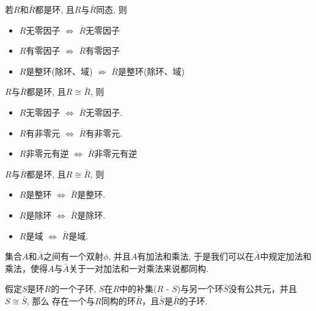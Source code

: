 \begin{Proposition}
若$R$和$\bar{R}$都是环, 且$R$与$\bar{R}$同态, 则
\begin{itemize}
	\item $R$无零因子 $\not\Rightarrow$ $\bar{R}$无零因子
	\item $R$有零因子 $\not\Rightarrow$ $\bar{R}$有零因子
	\item $R$是整环(除环、域) $\not\Rightarrow$ $\bar{R}$是整环(除环、域)
\end{itemize}
\end{Proposition}

\begin{Proposition}
$R$与$\bar{R}$都是环, 且$R \cong \bar{R}$, 则
\begin{itemize}
	\item $R$无零因子 $\Leftrightarrow$ $\bar{R}$无零因子.
	\item $R$有非零元 $\Leftrightarrow$ $\bar{R}$有非零元.
	\item  $R$非零元有逆 $\Leftrightarrow$ $\bar{R}$非零元有逆
\end{itemize}
\end{Proposition}

\begin{Theorem}
$R$与$\bar{R}$都是环, 且$R \cong \bar{R}$, 则
\begin{itemize}
	\item $R$是整环 $\Leftrightarrow$ $\bar{R}$是整环.
	\item  $R$是除环 $\Leftrightarrow$ $\bar{R}$是除环.
	\item  $R$是域 $\Leftrightarrow$ $\bar{R}$是域.
\end{itemize}
\end{Theorem}

\begin{Lemma}
集合$A$和$\bar{A}$之间有一个双射$\phi$, 并且$A$有加法和乘法, 于是我们可以在$\bar{A}$中规定加法和乘法，使得$A$与$\bar{A}$关于一对加法和一对乘法来说都同构.
\end{Lemma}

\begin{Theorem}
假定$S$是环$R$的一个子环, $S$在$R$中的补集($R$ - $S$)与另一个环$\bar{S}$没有公共元，并且$S \cong \bar{S}$, 那么
存在一个与$R$同构的环$\bar{R}$，且$\bar{S}$是$\bar{R}$的子环.
\end{Theorem}

\newcommand{\StubSize}{0.5em}%


